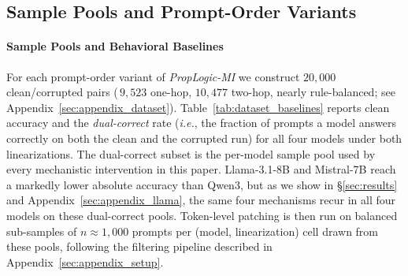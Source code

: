 \documentclass[11pt]{article}
\begin{document}



\subsection{Sample Pools and Prompt-Order Variants}
\label{sec:sample_pools}

\paragraph{Sample Pools and Behavioral Baselines}
For each prompt-order variant of \textit{PropLogic-MI} we construct $20{,}000$ clean/corrupted pairs (\,$9{,}523$ one-hop, $10{,}477$ two-hop, nearly rule-balanced; see Appendix~\ref{sec:appendix_dataset}). Table~\ref{tab:dataset_baselines} reports clean accuracy and the \emph{dual-correct} rate (\textit{i.e.}, the fraction of prompts a model answers correctly on both the clean and the corrupted run) for all four models under both linearizations. The dual-correct subset is the per-model sample pool used by every mechanistic intervention in this paper. Llama-3.1-8B and Mistral-7B reach a markedly lower absolute accuracy than Qwen3, but as we show in \S\ref{sec:results} and Appendix~\ref{sec:appendix_llama}, the same four mechanisms recur in all four models on these dual-correct pools. Token-level patching is then run on balanced sub-samples of $n \approx 1{,}000$ prompts per (model, linearization) cell drawn from these pools, following the filtering pipeline described in Appendix~\ref{sec:appendix_setup}.
\end{document}
